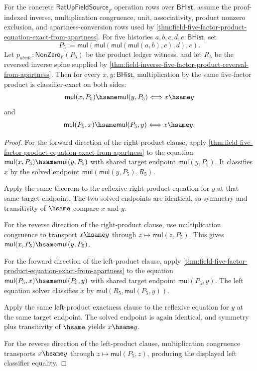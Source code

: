 \begin{theorem}
\label{thm:ratup-fieldup-five-factor-product-map-classifier-exactness}
For the concrete $\mathsf{RatUpFieldSource}_F$ operation rows over
$\mathsf{BHist}$, assume the proof-indexed inverse, multiplication congruence,
unit, associativity, product nonzero exclusion, and apartness-conversion rows
used by
\autoref{thm:field-five-factor-product-equation-exact-from-apartness}. For
five histories $a,b,c,d,e:\mathsf{BHist}$, set
$$
P_5:=\mathsf{mul}(\mathsf{mul}(\mathsf{mul}(\mathsf{mul}(a,b),c),d),e).
$$
Let $p_{abcde}:\mathsf{NonZero}_F(P_5)$ be the product ledger witness, and let
$R_5$ be the reversed inverse spine supplied by
\autoref{thm:field-inverse-five-factor-product-reversal-from-apartness}. Then
for every $x,y:\mathsf{BHist}$, multiplication by the same five-factor product
is classifier-exact on both sides:
$$
\mathsf{mul}(x,P_5)\hsame\mathsf{mul}(y,P_5)
\Longleftrightarrow
x\hsame y
$$
and
$$
\mathsf{mul}(P_5,x)\hsame\mathsf{mul}(P_5,y)
\Longleftrightarrow
x\hsame y.
$$
\end{theorem}
\begin{proof}
For the forward direction of the right-product clause, apply
\autoref{thm:field-five-factor-product-equation-exact-from-apartness} to the
equation $\mathsf{mul}(x,P_5)\hsame\mathsf{mul}(y,P_5)$ with shared target
endpoint $\mathsf{mul}(y,P_5)$. It classifies $x$ by the solved endpoint
$\mathsf{mul}(\mathsf{mul}(y,P_5),R_5)$.

Apply the same theorem to the reflexive right-product equation for $y$ at that
same target endpoint. The two solved endpoints are identical, so symmetry and
transitivity of $\hsame$ compare $x$ and $y$.

For the reverse direction of the right-product clause, use multiplication
congruence to transport $x\hsame y$ through
$z\mapsto\mathsf{mul}(z,P_5)$. This gives
$\mathsf{mul}(x,P_5)\hsame\mathsf{mul}(y,P_5)$.

For the forward direction of the left-product clause, apply
\autoref{thm:field-five-factor-product-equation-exact-from-apartness} to the
equation $\mathsf{mul}(P_5,x)\hsame\mathsf{mul}(P_5,y)$ with shared target
endpoint $\mathsf{mul}(P_5,y)$. The left equation solver classifies $x$ by
$\mathsf{mul}(R_5,\mathsf{mul}(P_5,y))$.

Apply the same left-product exactness clause to the reflexive equation for
$y$ at the same target endpoint. The solved endpoint is again identical, and
symmetry plus transitivity of $\hsame$ yields $x\hsame y$.

For the reverse direction of the left-product clause, multiplication
congruence transports $x\hsame y$ through
$z\mapsto\mathsf{mul}(P_5,z)$, producing the displayed left classifier
equality.
\end{proof}

